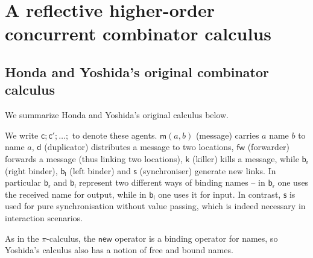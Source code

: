 \documentclass[submission,copyright,creativecommons]{eptcs}
\newcommand{\new}{\mathsf{new}}
\newcommand{\pic}{$\pi$-calculus}
\newcommand{\pzero}{\mathbin{0}}
\newcommand{\freenames}[1]{\mathbin{\mathsf{FN}(#1)}}
\newcommand{\bc}{\mathbin{\mathbf{::=}}}
\newcommand{\bm}{\mathbin{\mathbf\mid}}
\theoremstyle{definition}
\theoremstyle{remark}
\theoremstyle{remark}
\begin{document}
\section{A reflective higher-order concurrent combinator calculus}

\subsection{Honda and Yoshida's original combinator calculus}

We summarize Honda and Yoshida's original calculus
\cite{DBLP:journals/tcs/Yoshida02} below.


We write $\mathsf{c};\mathsf{c'};\ldots;$ to denote these
agents. $\mathsf{m}(a,b)$ (message) carries $a$ name $b$ to name $a$,
$\mathsf{d}$ (duplicator) distributes a message to two locations,
$\mathsf{fw}$ (forwarder) forwards a message (thus linking two
locations), $\mathsf{k}$ (killer) kills a message, while
$\mathsf{b}_{\mathsf{r}}$ (right binder), $\mathsf{b}_{\mathsf{l}}$
(left binder) and $\mathsf{s}$ (synchroniser) generate new links. In
particular $\mathsf{b}_{\mathsf{r}}$ and $\mathsf{b}_{\mathsf{l}}$
represent two different ways of binding names – in
$\mathsf{b}_{\mathsf{r}}$ one uses the received name for output, while
in $\mathsf{b}_{\mathsf{l}}$ one uses it for input. In contrast,
$\mathsf{s}$ is used for pure synchronisation without value passing,
which is indeed necessary in interaction scenarios.

As in the {\pic}, the $\new$ operator is a binding operator
for names, so Yoshida's calculus also has a notion of free and bound names.

\end{document}
